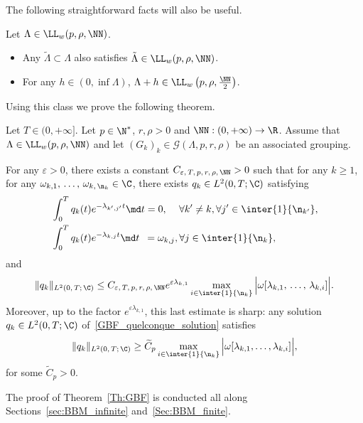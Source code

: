 The following straightforward facts will also be useful.
\begin{rema}\label{Rem:stabilite_Lw_inclusion}
Let $\Lambda\in \LL_w(p,\rho,\NN)$.
\begin{itemize}
\item Any $\tilde{\Lambda}\subset \Lambda$ also satisfies $\tilde{\Lambda}\in \LL_w(p,\rho,\NN)$.
\item For any $h \in (0,\inf \Lambda)$, $\Lambda+h\in \LL_w \left(p,\rho, \frac{\NN}{2} \right)$.
\end{itemize}
\end{rema}


Using this class we prove the following theorem.
\begin{theo} \label{Th:GBF}
Let $T \in (0,+\infty]$. Let $p \in \N^*$, $r, \rho > 0$ and $\NN : (0,+\infty) \to \R$. Assume that $\Lambda \in \LL_w(p,\rho, \NN)$ and let $(G_k)_k\in \mathcal{G}(\Lambda,p,r,\rho)$ be an associated grouping.

For any $\varepsilon > 0$, there exists a constant $C_{\varepsilon,\,T,\, p,\, r,\, \rho,\, \NN} >0$ such that for any $k \geq 1$, for any $\omega_{k,1},\,\dots,\,\omega_{k,\,\n_k} \in \C$, there exists $q_k \in L^2(0,T ; \C)$ satisfying
\begin{subequations}\label{GBF_quelconque}
\begin{align}
& \int_0^T q_k(t) e^{-\lambda_{k',j'} t } \md t= 0,\quad\,\forall k' \neq k, \forall j' \in \inter{1}{\n_{k'}},\label{GBF_quelconque_ortho}
\\
& \int_0^T q_k(t) e^{-\lambda_{k,j} t } \md t\;\:= \omega_{k,j}, \forall j \in \inter{1}{\n_k},\label{GBF_quelconque_solution}
\end{align}
\end{subequations}
and
\begin{equation}\label{Estimee_GBF}
\| q_k \|_{L^2(0,\,T ;\,\C)} \leq C_{\varepsilon,\,T,\,p,\,r,\,\rho,\,\NN} e^{\varepsilon \lambda_{k,1}} \max \limits_{i\in \inter{1}{\n_k}} \Big| \omega[\lambda_{k,1},\,\dots,\,\lambda_{k,i}] \Big|.
\end{equation}
Moreover, up to the factor $e^{\varepsilon \lambda_{k,1}}$, this last estimate is sharp: any solution $q_k \in L^2(0,T ; \C)$ of~\eqref{GBF_quelconque_solution} satisfies
\begin{equation}\label{Estimee_Inferieure_GBF}
\| q_k \|_{L^2(0,\,T ;\,\C)} \geq \widetilde{C}_{p} \max \limits_{i\in \inter{1}{\n_k}} \Big| \omega[\lambda_{k,1}, \dots, \lambda_{k,i}] \Big|,
\end{equation}
for some $\widetilde{C}_{p} >0$.
\end{theo} The proof of Theorem~\ref{Th:GBF} is conducted all along Sections~\ref{sec:BBM_infinite} and~\ref{Sec:BBM_finite}.

